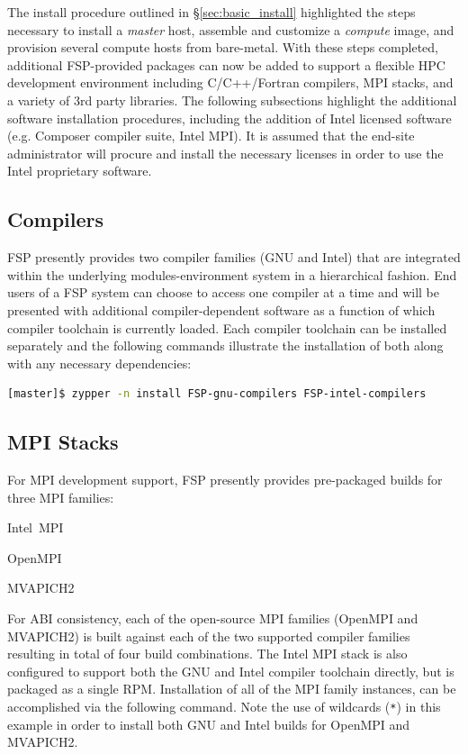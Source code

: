 \documentclass[letterpaper]{article}
\begin{document}
The install procedure outlined in \S\ref{sec:basic_install}
highlighted the steps necessary to install a {\em master} host,
assemble and customize a {\em compute} image, and provision several
compute hosts from bare-metal.  With these steps completed, 
additional FSP-provided packages can now be added to support a flexible HPC
development environment including C/C++/Fortran compilers, MPI stacks, and a
variety of 3rd party libraries. The following subsections highlight the
additional software installation procedures, including the addition of Intel
licensed software (e.g. Composer compiler suite, Intel MPI). It is assumed that
the end-site administrator will procure and install the necessary licenses in
order to use the Intel proprietary software.

\subsection{Compilers}

FSP presently provides two compiler families ({GNU} and {Intel}) that are
integrated within the underlying modules-environment system in a hierarchical
fashion. End users of a FSP system can choose to access one compiler at a time
and will be presented with additional compiler-dependent software as a function
of which compiler toolchain is currently loaded. Each compiler toolchain can be
installed separately and the following commands illustrate the installation of
both along with any necessary dependencies:

\begin{lstlisting}[language=bash]
[master]$ zypper -n install FSP-gnu-compilers FSP-intel-compilers
\end{lstlisting}

\subsection{MPI Stacks} \label{sec:mpi}

For MPI development support, FSP presently provides pre-packaged builds for
three MPI families: 

\begin{itemize*}
\item Intel~MPI
\item OpenMPI
\item MVAPICH2
\end{itemize*}
 For ABI consistency, each of the open-source MPI families (OpenMPI and
 MVAPICH2) is built against each of the two supported compiler families
 resulting in total of four build combinations.  The Intel MPI stack is also
 configured to support both the GNU and Intel compiler toolchain directly, but
 is packaged as a single RPM. Installation of all of the MPI family instances,
 can be accomplished via the following command. Note the use of wildcards
 (\texttt{*}) in this example in order to install both GNU and Intel builds for
 OpenMPI and MVAPICH2.
\end{document}
